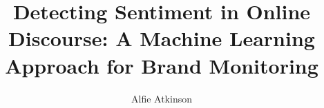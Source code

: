 \author{Alfie Atkinson}

\title{\bfseries Detecting Sentiment in Online Discourse: A Machine Learning Approach for Brand Monitoring}


